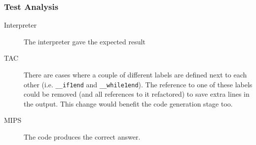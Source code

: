 \subsubsection{Test Analysis}
\begin{description}
	\item[Interpreter] The interpreter gave the expected result
	\item[TAC] There are cases where a couple of different labels are defined next to each other (i.e. \verb!__if1end! and \verb!__while1end!). The reference to one of these labels could be removed (and all references to it refactored) to save extra lines in the output. This change would benefit the code generation stage too.
	\item[MIPS] The code produces the correct answer.
\end{description}
